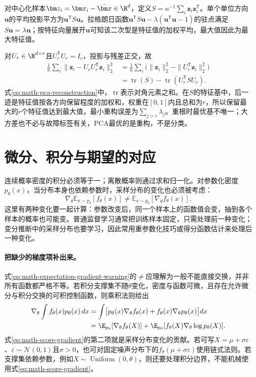 对中心化样本$\bm z_i=\bm x_i-\bar{\bm x}\in\R^d$，定义$S=n^{-1}\sum_i\bm z_i\bm z_i^{\mathsf T}$。单个单位方向$\bm u$的平均投影平方为$\bm u^{\mathsf T}S\bm u$。拉格朗日函数$\bm u^{\mathsf T}S\bm u-\lambda(\bm u^{\mathsf T}\bm u-1)$的驻点满足$S\bm u=\lambda\bm u$；按特征向量展开$\bm u$可知该二次型是特征值的加权平均，最大值因此为最大特征值。

对$U_r\in\R^{d\times r}$且$U_r^{\mathsf T}U_r=I_r$，投影与残差正交，故
\begin{align}
 \frac1n\sum_i\|\bm z_i-U_rU_r^{\mathsf T}\bm z_i\|_2^2
 &=\frac1n\sum_i\bigl(\|\bm z_i\|_2^2-\|U_r^{\mathsf T}\bm z_i\|_2^2\bigr)\\
 &=\operatorname{tr}(S)-\operatorname{tr}(U_r^{\mathsf T}SU_r).\label{eq:math-pca-reconstruction}
\end{align}
式\eqref{eq:math-pca-reconstruction}中，$\operatorname{tr}$表示对角元素之和。在$S$的特征基中，后一迹是特征值按各方向保留程度的加权和，权重在$[0,1]$内且总和为$r$，所以保留最大的$r$个特征值达到最大值，最小重构误差为$\sum_{j>r}\lambda_j$。重根时最优基不唯一；大方差也不必与故障标签有关，PCA最优的是重构，不是分类。

\section{微分、积分与期望的对应}
连续概率密度的积分必须等于一；离散概率则通过求和归一化。对参数化密度$p_\theta(x)$，当分布本身也依赖参数时，采样分布的变化也必须被考虑：
\begin{equation}
 \nabla_\theta\mathbb{E}_{x\sim p_\theta}[f_\theta(x)]
 \neq \mathbb{E}_{x\sim p_\theta}[\nabla_\theta f_\theta(x)].\label{eq:math-expectation-gradient-warning}
\end{equation}
这里有两种变化要一起计算：参数改变后，同一个样本上的函数值会变，抽到各个样本的概率也可能变。普通监督学习通常把训练样本固定，只需处理前一种变化；变分推断中的采样分布也要学习，因此常用重参数化技巧或得分函数估计来处理后一种变化。

\paragraph{把缺少的梯度项补出来。}
式\eqref{eq:math-expectation-gradient-warning}的$\neq$应理解为一般不能直接交换，并非所有函数都严格不等。若积分支撑集不随$\theta$变化，密度与函数可微，且存在允许微分与积分交换的可积控制函数，则乘积法则给出
\begin{align}
 \nabla_\theta\int f_\theta(x)p_\theta(x)\,dx
 &=\int\bigl[p_\theta(x)\nabla_\theta f_\theta(x)
       +f_\theta(x)\nabla_\theta p_\theta(x)\bigr]dx\\
 &=\E_{p_\theta}[\nabla_\theta f_\theta(X)]
   +\E_{p_\theta}[f_\theta(X)\nabla_\theta\log p_\theta(X)].\label{eq:math-score-gradient}
\end{align}
式\eqref{eq:math-score-gradient}的第二项就是采样分布变化的贡献。若可写$X=\mu+\sigma\varepsilon$、$\varepsilon\sim\mathcal N(0,1)$且$\sigma>0$，也可对固定噪声分布下的$f_\theta(\mu+\sigma\varepsilon)$使用链式法则。若支撑集依赖参数，例如$X\sim\operatorname{Uniform}(0,\theta)$，则还要处理积分边界，不能机械使用式\eqref{eq:math-score-gradient}。

